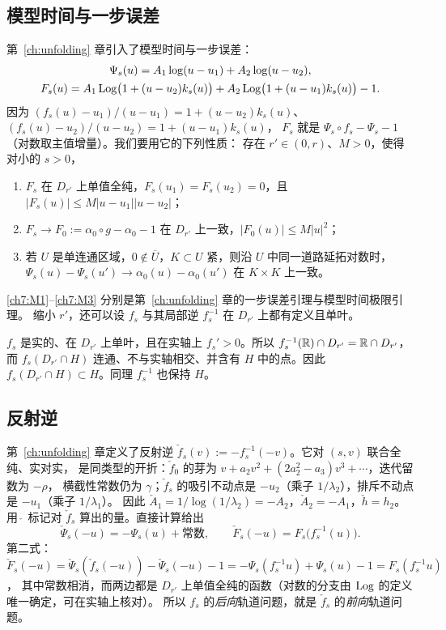 \subsection{模型时间与一步误差}
第~\ref{ch:unfolding} 章引入了模型时间与一步误差：
\[
\begin{gathered}
 \Psi_s(u)=A_1\log(u-u_1)+A_2\log(u-u_2),\\
 F_s(u)=A_1\operatorname{Log}\bigl(1+(u-u_2)k_s(u)\bigr)+A_2\operatorname{Log}\bigl(1+(u-u_1)k_s(u)\bigr)-1 .
\end{gathered}
\]
因为 $(f_s(u)-u_1)/(u-u_1)=1+(u-u_2)k_s(u)$、$(f_s(u)-u_2)/(u-u_2)=1+(u-u_1)k_s(u)$，
$F_s$ 就是 $\Psi_s\circ f_s-\Psi_s-1$（对数取主值增量）。我们要用它的下列性质：
存在 $r'\in(0,r)$、$M>0$，使得对小的 $s>0$，
\begin{enumerate}[label=(\textup{M\arabic*}),leftmargin=3em]
\item\label{ch7:M1} $F_s$ 在 $D_{r'}$ 上单值全纯，$F_s(u_1)=F_s(u_2)=0$，且 $|F_s(u)|\le M|u-u_1||u-u_2|$；
\item\label{ch7:M2} $F_s\to F_0:=\alpha_0\circ g-\alpha_0-1$ 在 $D_{r'}$ 上一致，$|F_0(u)|\le M|u|^2$；
\item\label{ch7:M3} 若 $U$ 是单连通区域，$0\notin\overline U$，$K\subset U$ 紧，则沿 $U$ 中同一道路延拓对数时，
  $\Psi_s(u)-\Psi_s(u')\to\alpha_0(u)-\alpha_0(u')$ 在 $K\times K$ 上一致。
\end{enumerate}
\ref{ch7:M1}--\ref{ch7:M3} 分别是第~\ref{ch:unfolding} 章的一步误差引理与模型时间极限引理。
缩小 $r'$，还可以设 $f_s$ 与其局部逆 $f_s^{-1}$ 在 $D_{r'}$ 上都有定义且单叶。

\begin{remark}\label{ch7:rem:real-H}
$f_s$ 是实的、在 $D_{r'}$ 上单叶，且在实轴上 $f_s'>0$。所以 $f_s^{-1}(\mathbb{R})\cap D_{r'}=\mathbb{R}\cap D_{r'}$，
而 $f_s(D_{r'}\cap H)$ 连通、不与实轴相交、并含有 $H$ 中的点。因此
$f_s(D_{r'}\cap H)\subset H$。同理 $f_s^{-1}$ 也保持 $H$。
\end{remark}

\subsection{反射逆}
第~\ref{ch:unfolding} 章定义了反射逆 $\check f_s(v):=-f_s^{-1}(-v)$。它对 $(s,v)$ 联合全纯、实对实，
是同类型的开折：$\check f_0$ 的芽为 $v+a_2v^2+(2a_2^2-a_3)v^3+\cdots$，迭代留数为 $-\rho$，
横截性常数仍为 $\gamma$；$\check f_s$ 的吸引不动点是 $-u_2$（乘子 $1/\lambda_2$），排斥不动点是 $-u_1$（乘子 $1/\lambda_1$）。
因此 $\check A_1=1/\log(1/\lambda_2)=-A_2$，$\check A_2=-A_1$，$\check h=h_2$。
用 $\check{\ }$ 标记对 $\check f_s$ 算出的量。直接计算给出
\begin{equation}\label{ch7:eq:reflect-F}
 \check\Psi_s(-u)=-\Psi_s(u)+\text{常数},\qquad \check F_s(-u)=F_s\bigl(f_s^{-1}(u)\bigr).
\end{equation}
第二式：$\check F_s(-u)=\check\Psi_s(\check f_s(-u))-\check\Psi_s(-u)-1=-\Psi_s(f_s^{-1}u)+\Psi_s(u)-1=F_s(f_s^{-1}u)$，
其中常数相消，而两边都是 $D_{r'}$ 上单值全纯的函数（对数的分支由 $\operatorname{Log}$ 的定义唯一确定，可在实轴上核对）。
所以 $f_s$ 的\emph{后向}轨道问题，就是 $\check f_s$ 的\emph{前向}轨道问题。

